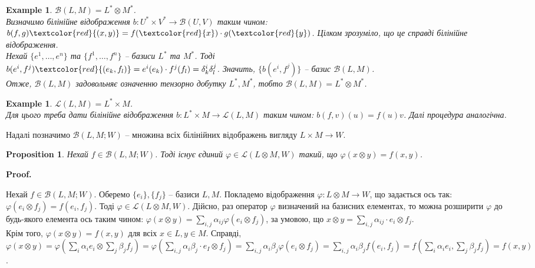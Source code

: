 \documentclass[a4paper, 10pt]{article}
\makeatletter
\theoremstyle{theoremdd}
\newtheorem{example}[theorem]{Example}
\newtheorem{proposition}[theorem]{Proposition}
\renewenvironment{proof}[1][Proof.\\]{\par
\pushQED{\hfill \qed}%
\normalfont \topsep6\p@\@plus6\p@\relax
\trivlist
\item\relax
{\bfseries
#1\@addpunct{.}}\hspace\labelsep\ignorespaces
}{%
\popQED\endtrivlist\@endpefalse
}
\makeatother
\begin{document}
\begin{example}
$\mathcal{B}(L,M) = L^* \otimes M^*$.\\
Визначимо білінійне відображення $b \colon U^* \times V^* \to \mathcal{B}(U,V)$ таким чином: $b(f,g)\textcolor{red}{(x,y)} = f(\textcolor{red}{x}) \cdot g(\textcolor{red}{y})$. Цілком зрозуміло, що це справді білінійне відображення.\\
Нехай $\{e^1,\dots,e^n\}$ та $\{f^1,\dots,f^n\}$ -- базиси $L^*$ та $M^*$. Тоді\\
$b(e^i,f^j)\textcolor{red}{(e_k,f_l)} = e^i(e_k) \cdot f^j(f_l) = \delta^i_k \delta^j_l$. Значить, $\{b(e^i,f^j)\}$ -- базис $\mathcal{B}(L,M)$.\\
Отже, $\mathcal{B}(L,M)$ задовольняє означенню тензорно добутку $L^*,M^*$, тобто $\mathcal{B}(L,M) = L^* \otimes M^*$.
\end{example}

\begin{example}
$\mathcal{L}(L,M) = L^* \times M$.\\
Для цього треба дати білінійне відображення $b \colon L^* \times M \to \mathcal{L}(L,M)$ таким чином: $b(f,v)(u) = f(u)v$. Далі процедура аналогічна.
\end{example}
\noindent
Надалі позначимо $\mathcal{B}(L,M; W)$ -- множина всіх білінійних відображень вигляду $L \times M \to W$.

\begin{proposition}
Нехай $f \in \mathcal{B}(L,M; W)$. Тоді існує єдиний $\varphi \in \mathcal{L}(L \otimes M, W)$ такий, що $\varphi(x \otimes y) = f(x,y)$.
\end{proposition}

\begin{proof}
Нехай $f \in \mathcal{B}(L,M; W)$. Оберемо $\{e_i\}, \{f_j\}$ -- базиси $L,M$. Покладемо відображення $\varphi \colon L \otimes M \to W$, що задається ось так: $\varphi(e_i \otimes f_j) = f(e_i,f_j)$. Тоді $\varphi \in \mathcal{L}(L \otimes M, W)$. Дійсно, раз оператор $\varphi$ визначений на базисних елементах, то можна розширити $\varphi$ до будь-якого елемента ось таким чином: $\varphi(x \otimes y) = \displaystyle\sum_{i,j} \alpha_{ij} \varphi(e_i \otimes f_j)$, за умовою, що $x \otimes y = \displaystyle\sum_{i,j} \alpha_{ij} \cdot e_i \otimes f_j$.\\
Крім того, $\varphi(x \otimes y) = f(x,y)$ для всіх $x \in L, y \in M$. Справді,\\
$\varphi(x \otimes y) = \displaystyle\varphi\left( \sum_i \alpha_i e_i \otimes \sum_j \beta_j f_j\right) = \varphi\left( \sum_{i,j} \alpha_i \beta_j \cdot e_I \otimes f_j\right) = \sum_{i,j} \alpha_i \beta_j \varphi(e_i \otimes f_j) = \sum_{i,j} \alpha_i \beta_j f(e_i,f_j) = f\left( \sum_i \alpha_i e_i, \sum_j \beta_j f_j\right) = f(x,y)$.
\end{proof}
\end{document}

